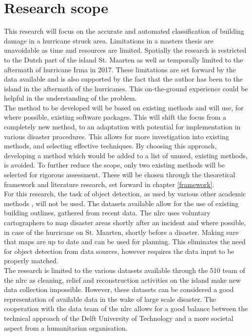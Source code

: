 \section{Research scope} \label{sec:scope}
This research will focus on the accurate and automated classification of building damage in a hurricane struck area. Limitations in a masters thesis are unavoidable as time and resources are limited. Spatially the research is restricted to the Dutch part of the island St. Maarten as well as temporally limited to the aftermath of hurricane Irma in 2017. These limitations are set forward by the data available and is also supported by the fact that the author has been to the island in the aftermath of the hurricanes. This on-the-ground experience could be helpful in the understanding of the problem. \\
The method to be developed will be based on existing methods and will use, for where possible, existing software packages. This will shift the focus from a completely new method, to an adaptation with potential for implementation in various disaster procedures. This allows for more investigation into existing methods, and selecting effective techniques. By choosing this approach, developing a method which would be added to a list of unused, existing methods, is avoided. To further reduce the scope, only two existing methods will be selected for rigorous assessment. These will be chosen through the theoretical framework and literature research, set forward in chapter \ref{framework}. \\
For this research, the task of object detection, as used by various other academic methods \citep{Vetrivel2016b,Kakooei2017}, will not be used. The datasets available allow for the use of existing building outlines, gathered from recent data. The \ac{nlrc} uses voluntary cartographers to map disaster areas shortly after an incident and where possible, in case of the hurricane on St. Maarten, shortly before a disaster. Making sure that maps are up to date and can be used for planning. This eliminates the need for object detection from data sources, however requires the data input to be properly matched.\\
The research is limited to the various datasets available through the 510 team of the \ac{nlrc} as cleaning, relief and reconstruction activities on the island make new data collection impossible. However, these datasets can be considered a good representation of available data in the wake of large scale disaster. The cooperation with the data team of the \ac{nlrc} allows for a good balance between the technical approach of the Delft University of Technology and a more societal aspect from a humanitarian organisation.\\ 

